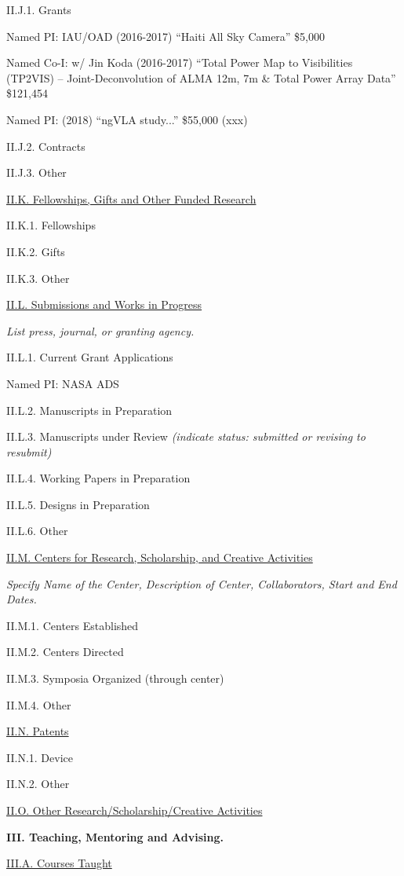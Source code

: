 \documentclass[11pt,letterpaper]{article}
\begin{document}
II.J.1. Grants

Named PI: IAU/OAD (2016-2017) ``Haiti All Sky Camera''
		\$5,000

Named Co-I: w/ Jin Koda (2016-2017)
``Total Power Map to Visibilities (TP2VIS) -- Joint-Deconvolution of ALMA 12m, 7m \& Total Power Array Data''
		\$121,454

Named PI: (2018)
``ngVLA study...'' \$55,000 (xxx)

II.J.2. Contracts

II.J.3. Other


\underline{II.K. Fellowships, Gifts and Other Funded Research}

II.K.1. Fellowships

II.K.2. Gifts

II.K.3. Other


\underline{II.L. Submissions and Works in Progress}

\textit{List press, journal, or granting agency.}

II.L.1. Current Grant Applications

Named PI: NASA ADS

II.L.2. Manuscripts in Preparation

II.L.3. Manuscripts under Review \textit{(indicate status:  submitted or revising to resubmit)}

II.L.4. Working Papers in Preparation

II.L.5. Designs in Preparation

II.L.6. Other


\underline{II.M. Centers for Research, Scholarship, and Creative Activities}

\textit{Specify Name of the Center, Description of Center, Collaborators, Start and End Dates.}

II.M.1. Centers Established

II.M.2. Centers Directed

II.M.3. Symposia Organized (through center)

II.M.4. Other


\underline{II.N. Patents}

II.N.1. Device

II.N.2. Other


\underline{II.O. Other Research/Scholarship/Creative Activities}


\textbf{III. Teaching, Mentoring and Advising.}


\underline{III.A. Courses Taught}

\end{document}
